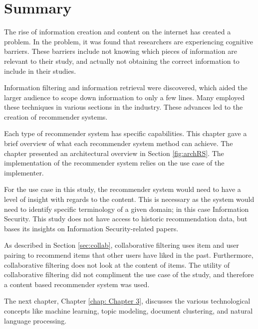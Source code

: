 \section{Summary}
The rise of information creation and content on the internet has created a problem. In the problem, it was found that researchers are experiencing cognitive barriers. These barriers include not knowing which pieces of information are relevant to their study, and actually not obtaining the correct information to include in their studies.

Information filtering and information retrieval were discovered, which aided the larger audience to scope down information to only a few lines. Many employed these techniques in various sections in the industry. These advances led to the creation of recommender systems.

Each type of recommender system has specific capabilities. This chapter gave a brief overview of what each recommender system method can achieve.  The chapter presented an architectural overview in Section \ref{fig:archRS}. The implementation of the recommender system relies on the use case of the implementer. 

For the use case in this study, the recommender system would need to have a level of insight with regards to the content.  This is necessary as the system would need to identify specific terminology of a given domain; in this case Information Security.  This study does not have access to historic recommendation data, but bases its insights on Information Security-related papers. 

As described in Section \ref{sec:collab}, collaborative filtering uses item and user pairing to recommend items that other users have liked in the past. Furthermore, collaborative filtering does not look at the content of items. The utility of collaborative filtering did not compliment the use case of the study, and therefore a content based recommender system was used.

The next chapter, Chapter \ref{chap: Chapter 3}, discusses the various technological concepts like machine learning, topic modeling, document clustering, and natural language processing.



